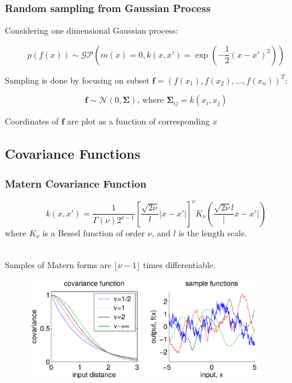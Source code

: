 \documentclass[10pt]{beamer}
\newcommand{\boldf}{\mathbf{f}}
\newcommand{\gp}{\mathcal{GP}}
\newcommand{\gaussN}{\mathcal{N}}
\newcommand{\bSig}{\boldsymbol{\Sigma}}
\begin{document}
  \begin{frame}
    \frametitle{Random sampling from Gaussian Process}
    Considering one dimensional Gaussian process:

    \begin{equation*}
      p(f(x)) \sim \gp \left( m(x) = 0, k(x,x') = \exp \left( - \frac{1}{2} (x - x')^2 \right) \right)
    \end{equation*}

    Sampling is done by focusing on subset $\boldf = (f(x_1), f(x_2),\dots,f(x_n))^T$:

    \begin{equation*}
      \boldf \sim \gaussN(0,\bSig) \text{, where } \bSig_{ij} = k(x_i,x_j)
    \end{equation*}

    Coordinates of $\boldf$ are plot as a function of corresponding $x$
  \end{frame}

  \subsection{Covariance Functions}

  \begin{frame}
    \frametitle{Matern Covariance Function}

    \begin{equation*}
      k(x,x') = \frac{1}{\Gamma(\nu) 2^{\nu - 1}} \left[ \frac{\sqrt{2 \nu}}{l} |x - x'| \right]^{\nu} K_{\nu} \left( \frac{\sqrt{2 \nu}{l}} |x - x'| \right)
    \end{equation*}
    where $K_{\nu}$ is a Bessel function of order $\nu$, and $l$ is the length scale.\\~

    Samples of Matern forms are $\lfloor \nu - 1 \rfloor$ times differentiable.

    \begin{figure}
      \centering
      \includegraphics[width=0.9\textwidth]{maternCovFunc.png}
    \end{figure}

  \end{frame}
\end{document}
